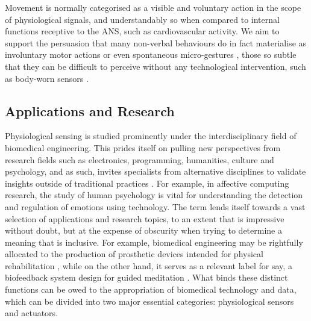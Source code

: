 Movement is normally categorised as a visible and voluntary action in the scope of physiological signals, and understandably so when compared to internal functions receptive to the ANS, such as cardiovascular activity. We aim to support the persuasion that many non-verbal behaviours do in fact materialise as involuntary motor actions \cite{haueisen_involuntary_2001} or even spontaneous micro-gestures \cite{chen_analyze_2019}, those so subtle that they can be difficult to perceive without any technological intervention, such as body-worn sensors \cite{jensenius_exploring_2017}.




\subsection{Applications and Research}

Physiological sensing is studied prominently under the interdisciplinary field of biomedical engineering. This prides itself on pulling new perspectives from research fields such as electronics, programming, humanities, culture and psychology, and as such, invites specialists from alternative disciplines to validate insights outside of traditional practices \cite{enderle_introduction_2012}. For example, in affective computing research, the study of human psychology is vital for understanding the detection and regulation of emotions using technology. The term lends itself towards a vast selection of applications and research topics, to an extent that is impressive without doubt, but at the expense of obscurity when trying to determine a meaning that is inclusive. For example, biomedical engineering may be rightfully allocated to the production of prosthetic devices intended for physical rehabilitation \cite{valentinuzzi_physical_2019}, while on the other hand, it serves as a relevant label for say, a biofeedback system design for guided meditation \cite{foo_soft_2020}. What binds these distinct functions can be owed to the appropriation of biomedical technology and data, which can be divided into two major essential categories: physiological sensors and actuators.

